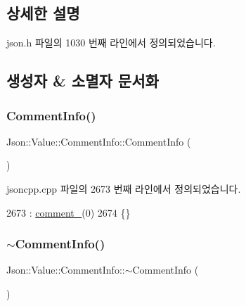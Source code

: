 \subsection{상세한 설명}


json.\+h 파일의 1030 번째 라인에서 정의되었습니다.



\subsection{생성자 \& 소멸자 문서화}
\mbox{\label{struct_json_1_1_value_1_1_comment_info_ab23b0c125695d284bded2fb106a49043}} 
\subsubsection{\texorpdfstring{Comment\+Info()}{CommentInfo()}}
{\footnotesize\ttfamily Json\+::\+Value\+::\+Comment\+Info\+::\+Comment\+Info (\begin{DoxyParamCaption}{ }\end{DoxyParamCaption})}



jsoncpp.\+cpp 파일의 2673 번째 라인에서 정의되었습니다.


\begin{DoxyCode}
2673                               : \hyperlink{struct_json_1_1_value_1_1_comment_info_a020f19c7098bab8ec8fec14cd1a5afb9}{comment\_}(0)
2674 \{\}
\end{DoxyCode}
\mbox{\label{struct_json_1_1_value_1_1_comment_info_ab4d0877190bdbf484e4e2a3bade42ac8}} 
\subsubsection{\texorpdfstring{$\sim$\+Comment\+Info()}{~CommentInfo()}}
{\footnotesize\ttfamily Json\+::\+Value\+::\+Comment\+Info\+::$\sim$\+Comment\+Info (\begin{DoxyParamCaption}{ }\end{DoxyParamCaption})}



